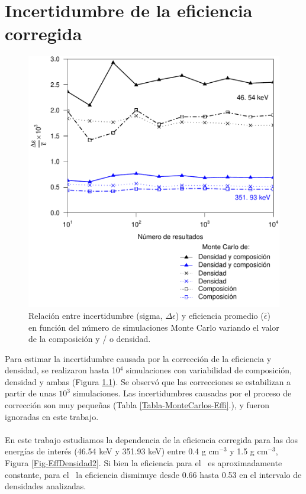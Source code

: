 \chapter{Incertidumbre de la eficiencia corregida}\label{SecResulIncertidumbreEffMonteCarlo}
\begin{figure}
\centering
\includegraphics[width=\textwidth]{Imagenes/GOMRI-500_Eff_Point_Sec-21-75_cm.pdf}
\caption{Relación entre incertidumbre (sigma, $\Delta \epsilon$) y eficiencia promedio ($\bar{\epsilon}$) en función del número de simulaciones Monte Carlo variando el valor de la composición y / o densidad.}\label{Fig-MonteCarlo-Eficiencia}
\end{figure}
\lettrine{P}{}ara estimar la incertidumbre causada por la corrección de la eficiencia y densidad, se realizaron hasta 10$^{4}$ simulaciones con variabilidad de composición, densidad y ambas (Figura \ref{Fig-MonteCarlo-Eficiencia}). Se observó que las correcciones se estabilizan a partir de unas $10^3$ simulaciones. Las incertidumbres causadas por el proceso de corrección son muy pequeñas (Tabla \ref{Tabla-MonteCarlos-Effi}.), y fueron ignoradas en este trabajo. 
\\
\\
En este trabajo estudiamos la dependencia de la eficiencia corregida para las dos energías de interés (46.54 keV y 351.93 keV) entre 0.4 g cm$^{-3}$ y 1.5 g cm$^{-3}$, Figura \ref{Fig-EffDensidad2}. Si bien la eficiencia para el \PbCuatro\, es aproximadamente constante, para el \PbCero\, la eficiencia disminuye desde 0.66 hasta 0.53 en el intervalo de densidades analizadas.
